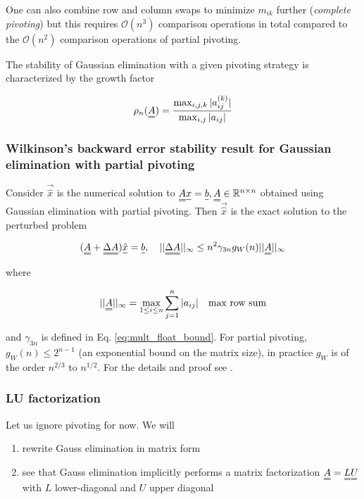 One can also combine row and column swaps to minimize $m_{ik}$ further (\textit{complete pivoting}) but this
requires $\mathcal{O}(n^3)$ comparison operations in total compared to the $\mathcal{O}(n^2)$ comparison operations 
of partial pivoting.

The stability of Gaussian elimination with a given pivoting strategy is 
characterized by the growth factor

\begin{equation}
    \rho_n(\mat{A}) =  \frac{\max_{i,j,k} |a_{ij}^{(k)}|}{\max_{i,j} |a_{ij}|}
\end{equation}

\subsubsection{Wilkinson's backward error stability result for Gaussian elimination with partial pivoting}

Consider $\vec{\hat{x}}$ is the numerical solution to $\mat{A}\vec{x} = \vec{b}, \mat{A} \in \mathbb{R}^{n \times n}$
obtained using Gaussian elimination with partial pivoting. Then  $\vec{\hat{x}}$ is the
exact solution to the perturbed problem

\begin{equation}
    (\mat{A} + \mat{\Delta A}) \vec{\hat{x}} = \vec{b}, \quad ||\mat{\Delta A}||_\infty \leq n^2 \gamma_{3n} g_W(n) ||\mat{A}||_\infty
\end{equation}

where 

\begin{equation}
    ||\mat{A}||_\infty = \max_{1\leq i \leq n} \sum_{j=1}^{n} |a_{ij}| \quad \text{max row sum}
\end{equation}

and $\gamma_{3n}$ is defined in Eq. \ref{eq:mult_float_bound}. For partial pivoting,
$g_W(n) \leq 2^{n-1}$ (an exponential bound on the matrix size), in practice $g_W$
is of the order $n^{2/3}$ to $n^{1/2}$. For the details 
and proof see \cite[Theorem 9.5]{higham02}.

\subsubsection{LU factorization}
Let us ignore pivoting for now. We will

\begin{enumerate}
    \item rewrite Gauss elimination in matrix form
    \item see that Gauss elimination implicitly performs
    a matrix factorization $\mat{A} = \mat{L} \mat{U}$ with $L$ lower-diagonal
    and $U$ upper diagonal
\end{enumerate}


